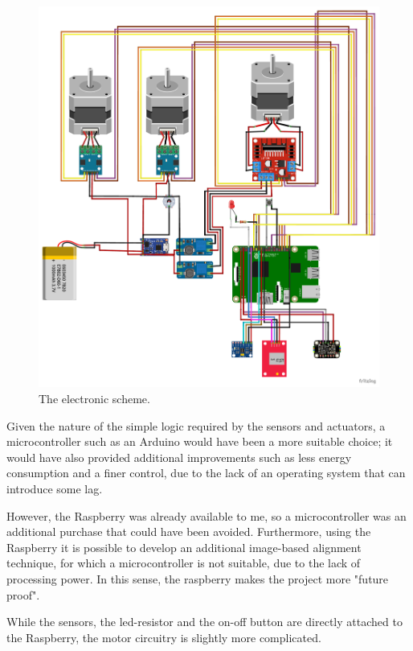 \documentclass[]{article}
\begin{document}
\begin{figure}[H]
	\centering
	\includegraphics[width=\linewidth]{images/electronic/schema.pdf}
	\caption{The electronic scheme.}
	\label{fig:elecfullscheme}
\end{figure}

Given the nature of the simple logic required by the sensors and actuators, a microcontroller such as an Arduino would have been a more suitable choice; it would have also provided additional improvements such as less energy consumption and a finer control, due to the lack of an operating system that can introduce some lag. 

However, the Raspberry was already available to me, so a microcontroller was an additional purchase that could have been avoided.  Furthermore, using the Raspberry it is possible to develop an additional image-based alignment technique, for which a microcontroller is not suitable, due to the lack of processing power. In this sense, the raspberry makes the project more "future proof". 

While the sensors, the led-resistor and the on-off button are directly attached to the Raspberry, the motor circuitry is slightly more complicated. 
\end{document}
